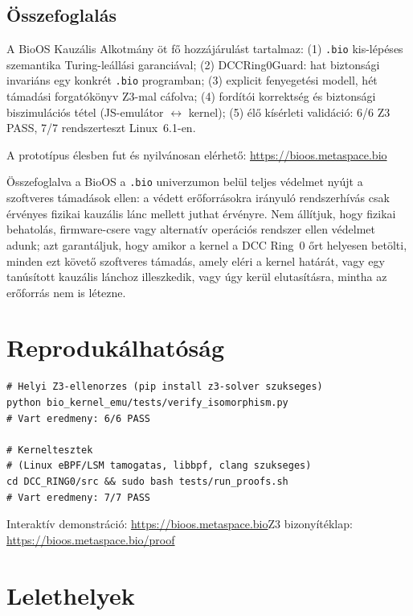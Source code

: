 \documentclass[11pt,a4paper,twoside]{article}
\newcommand{\bioURL}{\url{https://bioos.metaspace.bio}}
\newcommand{\proofURL}{\url{https://bioos.metaspace.bio/proof}}
\begin{document}
\subsection{Összefoglalás}

A BioOS Kauzális Alkotmány öt fő hozzájárulást tartalmaz:
(1) \texttt{.bio} kis-lépéses szemantika Turing-leállási garanciával;
(2) DCCRing0Guard: hat biztonsági invariáns egy konkrét \texttt{.bio} programban;
(3) explicit fenyegetési modell, hét támadási forgatókönyv Z3-mal cáfolva;
(4) fordítói korrektség és biztonsági biszimulációs tétel (JS-emulátor $\leftrightarrow$ kernel);
(5) élő kísérleti validáció: 6/6 Z3 PASS, 7/7 rendszerteszt Linux~6.1-en.

A prototípus élesben fut és nyilvánosan elérhető: \bioURL

Összefoglalva a BioOS a \texttt{.bio} univerzumon belül teljes védelmet nyújt a
szoftveres támadások ellen: a védett erőforrásokra irányuló rendszerhívás csak
érvényes fizikai kauzális lánc mellett juthat érvényre. Nem állítjuk, hogy fizikai
behatolás, firmware-csere vagy alternatív operációs rendszer ellen védelmet adunk;
azt garantáljuk, hogy amikor a kernel a DCC Ring~0 őrt helyesen betölti, minden ezt
követő szoftveres támadás, amely eléri a kernel határát, vagy egy tanúsított kauzális
lánchoz illeszkedik, vagy úgy kerül elutasításra, mintha az erőforrás nem is létezne.

\appendix

\section{Reprodukálhatóság}

\begin{lstlisting}[style=shellstyle]
# Helyi Z3-ellenorzes (pip install z3-solver szukseges)
python bio_kernel_emu/tests/verify_isomorphism.py
# Vart eredmeny: 6/6 PASS

# Kerneltesztek
# (Linux eBPF/LSM tamogatas, libbpf, clang szukseges)
cd DCC_RING0/src && sudo bash tests/run_proofs.sh
# Vart eredmeny: 7/7 PASS
\end{lstlisting}

Interaktív demonstráció: \bioURL\quad Z3 bizonyítéklap: \proofURL

\section{Lelethelyek}
\end{document}
